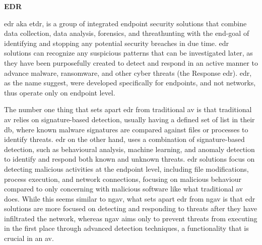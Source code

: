 \textbf{EDR}

\acrshort{edr} \acrshort{aka} \acrshort{etdr}, is a group of integrated endpoint security solutions that combine data collection,
data analysis, forensics, and \gls{threathunting} with the end-goal of identifying and stopping any potential security breaches in due
time. \acrshort{edr} solutions can recognize any suspicious patterns that can be investigated later, as they have been
purposefully created to detect and respond in an active manner to advance malware, ransomware, and other cyber threats (the Response
\acrshort{edr}). \acrshort{edr}, as the name suggest, were developed specifically for endpoints, and not networks, thus
operate only on endpoint level.

The number one thing that sets apart \acrshort{edr} from traditional \acrshort{av} is that traditional \acrshort{av} relies on
signature-based detection, usually having a defined set of list in their \acrshort{db}, where known malware signatures are compared
against files or processes to identify threats. \acrshort{edr} on the other hand, uses a combination of signature-based detection, such
as behavioural analysis, machine learning, and anomaly detection to identify and respond both known and unknown threats. \acrshort{edr}
solutions focus on detecting malicious activities at the endpoint level, including file modifications, process execution, and network
connections, focusing on malicious behaviour compared to only concerning with malicious software like what traditional \acrshort{av} does.
While this seems similar to \acrshort{ngav}, what sets apart \acrshort{edr} from \acrshort{ngav} is that \acrshort{edr} solutions are
more focused on detecting and responding to threats after they have infiltrated the network, whereas \acrshort{ngav} aims only to
prevent threats from executing in the first place through advanced detection techniques, a functionality that is crucial in an \acrshort{av}.



